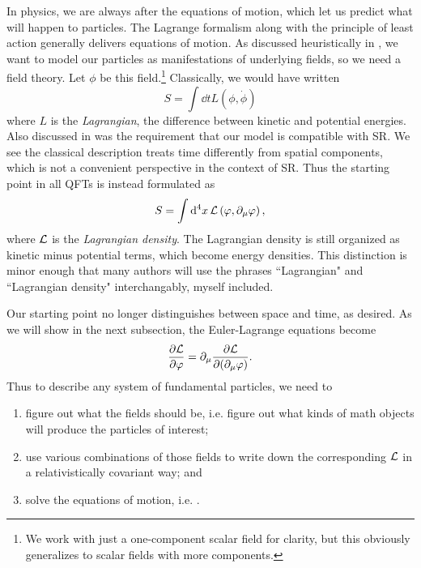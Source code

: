 In physics, we are always after the equations of motion, which let us predict
what will happen to particles. The Lagrange formalism along with the principle
of least action generally delivers equations of motion. As discussed
heuristically in , we want to model our particles as
manifestations of underlying fields, so we need a field theory. Let $\phi$ be
this field.\footnote{We work with just a one-component scalar field for clarity, but this
obviously generalizes to scalar fields with more components.} Classically, 
we would have written
\begin{equation}\label{eq:classicalLagrangian}
S=\int\dd{t}L\left(\phi,\dot\phi\right)
\end{equation}
where $L$ is the {\it Lagrangian}, the difference between
kinetic and potential energies. Also discussed in
 was the requirement that our model is compatible
with SR. We see the classical description 
treats time differently from spatial components, which is not a convenient
perspective in the context of SR. Thus the starting point in all QFTs is instead
formulated as
\begin{equation}\label{eq:QFTLagrangian}
S=\int\dd[4]{x} \mathcal{L}\left(\varphi,\partial_\mu\varphi\right),
\end{equation}
where $\mathcal{L}$ is the {\it Lagrangian density}. The Lagrangian density is still
organized as kinetic minus potential terms, which become energy densities. 
This distinction is minor enough that many authors will use the phrases
``Lagrangian" and ``Lagrangian density" interchangably, myself included.

Our starting point no longer distinguishes between space and time, as desired.
As we will show in the next subsection, the Euler-Lagrange equations become
\begin{equation}\label{eq:EL}
\pdv{\mathcal{L}}{\varphi}=\partial_\mu\pdv{\mathcal{L}}{(\partial_\mu\varphi)}.
\end{equation}
Thus to describe any system of fundamental particles, we need to
\begin{enumerate}
\item figure out what the fields should be, i.e. figure out what kinds of
math objects will produce the particles of interest;
\item use various combinations of those fields to write down the 
corresponding $\mathcal{L}$ in a relativistically covariant way; and
\item solve the equations of motion, i.e. .
\end{enumerate}

